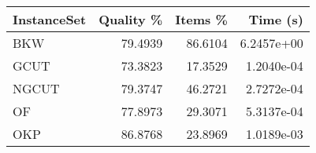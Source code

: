 \begin{tabular}{lrrr}
    \hline
    InstanceSet & Quality \% & Items \% & Time (s)   \\
    \hline
    BKW         & 79.4939    & 86.6104  & 6.2457e+00 \\
    GCUT        & 73.3823    & 17.3529  & 1.2040e-04 \\
    NGCUT       & 79.3747    & 46.2721  & 2.7272e-04 \\
    OF          & 77.8973    & 29.3071  & 5.3137e-04 \\
    OKP         & 86.8768    & 23.8969  & 1.0189e-03 \\
    \hline
\end{tabular}